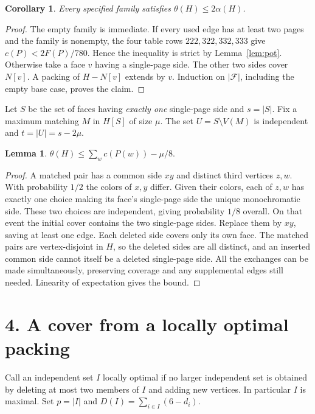 \documentclass[11pt,a4paper]{article}
\newtheorem{lemma}[theorem]{Lemma}
\newtheorem{corollary}[theorem]{Corollary}
\newcommand{\F}{\mathcal F}
\newcommand{\NN}{N}
\begin{document}
\begin{corollary}\label{cor:two}
Every specified family satisfies \(\theta(H)\le 2\alpha(H)\).
\end{corollary}
\begin{proof}
The empty family is immediate.
If every used edge has at least two pages and the family is nonempty, the
four table rows \(222,322,332,333\) give \(c(P)<2F(P)/780\).
Hence the inequality is strict by Lemma~\ref{lem:pot}.
Otherwise take a face \(v\) having a single-page side. The other two
sides cover \(\NN[v]\). A packing of \(H-\NN[v]\) extends by \(v\).
Induction on \(|\F|\), including the empty base case, proves the claim.
\end{proof}

Let \(S\) be the set of faces having \emph{exactly one} single-page side
and \(s=|S|\). Fix a maximum matching \(M\) in \(H[S]\) of size \(\mu\).
The set \(U=S\setminus V(M)\) is independent and \(t=|U|=s-2\mu\).

\begin{lemma}\label{lem:matched}
\(\displaystyle \theta(H)\le\sum_w c(P(w))-\mu/8.\)
\end{lemma}
\begin{proof}
A matched pair has a common side \(xy\) and distinct third vertices \(z,w\).
With probability \(1/2\) the colors of \(x,y\) differ. Given their colors,
each of \(z,w\) has exactly one choice making its face's single-page side
the unique monochromatic side. These two choices are independent, giving
probability \(1/8\) overall. On that event the initial cover contains the
two single-page sides. Replace them by \(xy\), saving at least one edge.
Each deleted side covers only its own face. The matched pairs are
vertex-disjoint in \(H\), so the deleted sides are all distinct, and an
inserted common side cannot itself be a deleted single-page side. All the
exchanges can be made simultaneously, preserving coverage and any
supplemental edges still needed. Linearity of expectation gives the bound.
\end{proof}

\newpage
\section*{4. A cover from a locally optimal packing}

Call an independent set \(I\) locally optimal if no larger independent
set is obtained by deleting at most two members of \(I\) and adding new
vertices. In particular \(I\) is maximal. Set \(p=|I|\) and
\(D(I)=\sum_{i\in I}(6-d_i)\).
\end{document}
